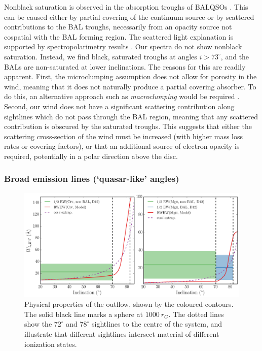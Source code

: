 \documentclass[useAMS,usenatbib]{mn2e_x}
\begin{document}
Nonblack saturation is observed in the absorption troughs of BALQSOs \citep{arav1999a,arav1999b}.
This can be caused either by partial covering of the continuum
source or by scattered contributions to the BAL troughs, necessarily
from an opacity source not cospatial with the BAL forming region.
The scattered light explanation is supported by spectropolarimetry results
\citep{lamy2000}. Our spectra do not show nonblack saturation.
Instead, we find black, saturated troughs at angles $i > 73^\circ$, and the BALs
are non-saturated at lower inclinations. The reasons for this are readily apparent. 
First, the microclumping assumption does not allow for 
porosity in the wind, meaning that it does not naturally produce
a partial covering absorber. To do this, an alternative approach
such as {\em macroclumping} would be required \citep[e.g.][]{surlan2012,hamann2008}.
Second, our wind does not have a significant scattering 
contribution along sightlines which do not pass through the BAL region,
meaning that any scattered contribution is obscured by the saturated troughs.
This suggests that either the scattering cross-section of the wind must
be increased (with higher mass loss rates or covering factors), or 
that an additional source of electron opacity is required, potentially
in a polar direction above the disc.


\subsubsection{Broad emission lines (`quasar-like' angles)}

\begin{figure} %
\centering
\includegraphics[width=1.0\textwidth]{figures/ew.png}
\caption
{
Physical properties of the outflow, shown by the coloured contours.
The solid black line marks a sphere at $1000~r_G$.
The dotted lines show the $72^\circ$ and $78^\circ$ sightlines 
to the centre of the system, and illustrate that different sightlines
intersect material of different ionization states.
}
\label{fig:ew}
\end{figure} %
\end{document}
